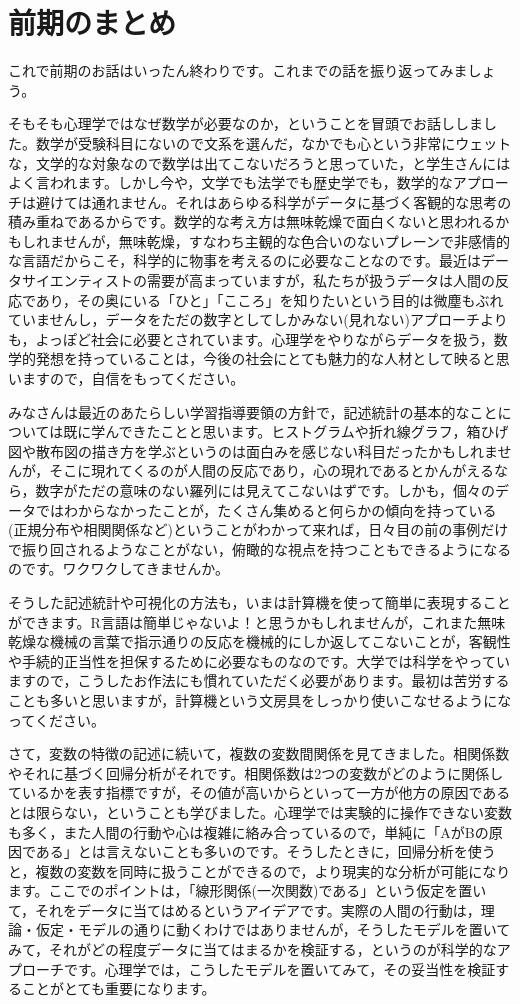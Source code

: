 \documentclass{ltjbook}
\begin{document}
\chapter{前期のまとめ}
\label{ch15_FirstSemester}
これで前期のお話はいったん終わりです。これまでの話を振り返ってみましょう。

そもそも心理学ではなぜ数学が必要なのか，ということを冒頭でお話ししました。数学が受験科目にないので文系を選んだ，なかでも心という非常にウェットな，文学的な対象なので数学は出てこないだろうと思っていた，と学生さんにはよく言われます。しかし今や，文学でも法学でも歴史学でも，数学的なアプローチは避けては通れません。それはあらゆる科学がデータに基づく客観的な思考の積み重ねであるからです。数学的な考え方は無味乾燥で面白くないと思われるかもしれませんが，無味乾燥，すなわち主観的な色合いのないプレーンで非感情的な言語だからこそ，科学的に物事を考えるのに必要なことなのです。最近はデータサイエンティストの需要が高まっていますが，私たちが扱うデータは人間の反応であり，その奥にいる「ひと」「こころ」を知りたいという目的は微塵もぶれていませんし，データをただの数字としてしかみない(見れない)アプローチよりも，よっぽど社会に必要とされています。心理学をやりながらデータを扱う，数学的発想を持っていることは，今後の社会にとても魅力的な人材として映ると思いますので，自信をもってください。

みなさんは最近のあたらしい学習指導要領の方針で，記述統計の基本的なことについては既に学んできたことと思います。ヒストグラムや折れ線グラフ，箱ひげ図や散布図の描き方を学ぶというのは面白みを感じない科目だったかもしれませんが，そこに現れてくるのが人間の反応であり，心の現れであるとかんがえるなら，数字がただの意味のない羅列には見えてこないはずです。しかも，個々のデータではわからなかったことが，たくさん集めると何らかの傾向を持っている(正規分布や相関関係など)ということがわかって来れば，日々目の前の事例だけで振り回されるようなことがない，俯瞰的な視点を持つこともできるようになるのです。ワクワクしてきませんか。

そうした記述統計や可視化の方法も，いまは計算機を使って簡単に表現することができます。R言語は簡単じゃないよ！と思うかもしれませんが，これまた無味乾燥な機械の言葉で指示通りの反応を機械的にしか返してこないことが，客観性や手続的正当性を担保するために必要なものなのです。大学では科学をやっていますので，こうしたお作法にも慣れていただく必要があります。最初は苦労することも多いと思いますが，計算機という文房具をしっかり使いこなせるようになってください。

さて，変数の特徴の記述に続いて，複数の変数間関係を見てきました。相関係数やそれに基づく回帰分析がそれです。相関係数は2つの変数がどのように関係しているかを表す指標ですが，その値が高いからといって一方が他方の原因であるとは限らない，ということも学びました。心理学では実験的に操作できない変数も多く，また人間の行動や心は複雑に絡み合っているので，単純に「AがBの原因である」とは言えないことも多いのです。そうしたときに，回帰分析を使うと，複数の変数を同時に扱うことができるので，より現実的な分析が可能になります。ここでのポイントは，「線形関係(一次関数)である」という仮定を置いて，それをデータに当てはめるというアイデアです。実際の人間の行動は，理論・仮定・モデルの通りに動くわけではありませんが，そうしたモデルを置いてみて，それがどの程度データに当てはまるかを検証する，というのが科学的なアプローチです。心理学では，こうしたモデルを置いてみて，その妥当性を検証することがとても重要になります。
\end{document}
